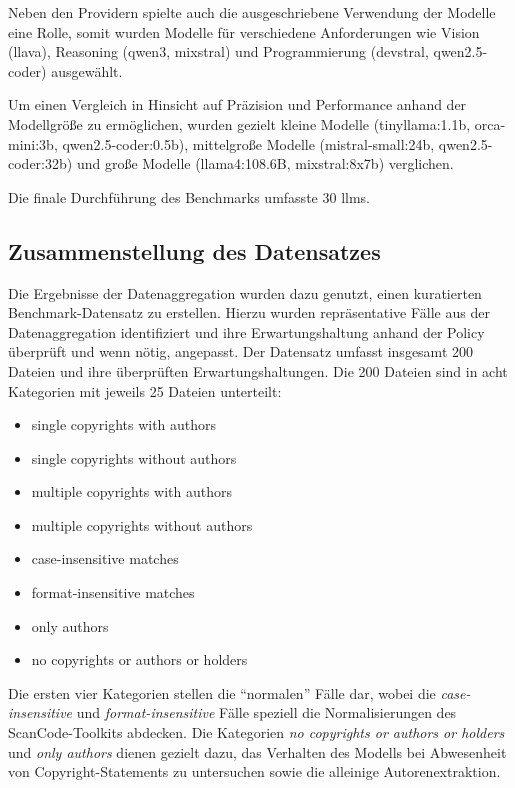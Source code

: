 Neben den Providern spielte auch die ausgeschriebene Verwendung der Modelle eine Rolle, somit wurden Modelle für verschiedene Anforderungen wie Vision (llava), Reasoning (qwen3, mixstral) und Programmierung (devstral, qwen2.5-coder) ausgewählt.

Um einen Vergleich in Hinsicht auf Präzision und Performance anhand der Modellgröße zu ermöglichen, wurden gezielt kleine Modelle (tinyllama:1.1b, orca-mini:3b, qwen2.5-coder:0.5b), mittelgroße Modelle (mistral-small:24b, qwen2.5-coder:32b) und große Modelle (llama4:108.6B, mixstral:8x7b) verglichen.

Die finale Durchführung des Benchmarks umfasste 30 \glspl{llm}.


\subsection{Zusammenstellung des Datensatzes}\label{sec:datensatz-benchmark}

Die Ergebnisse der Datenaggregation wurden dazu genutzt, einen kuratierten Benchmark-Datensatz zu erstellen.
Hierzu wurden repräsentative Fälle aus der Datenaggregation identifiziert und ihre Erwartungshaltung anhand der Policy überprüft und wenn nötig, angepasst.
Der Datensatz umfasst insgesamt \num{200} Dateien und ihre überprüften Erwartungshaltungen.
Die \num{200} Dateien sind in acht Kategorien mit jeweils \num{25} Dateien unterteilt:

\begin{itemize}
    \item single copyrights with authors
    \item single copyrights without authors
    \item multiple copyrights with authors
    \item multiple copyrights without authors
    \item case-insensitive matches
    \item format-insensitive matches
    \item only authors
    \item no copyrights or authors or holders
\end{itemize}

Die ersten vier Kategorien stellen die \enquote{normalen} Fälle dar, wobei die \textit{case-insensitive} und \textit{format-insensitive} Fälle speziell die Normalisierungen des ScanCode-Toolkits abdecken.
Die Kategorien \textit{no copyrights or authors or holders} und \textit{only authors} dienen gezielt dazu, das Verhalten des Modells bei Abwesenheit von Copyright-Statements zu untersuchen sowie die alleinige Autorenextraktion.

